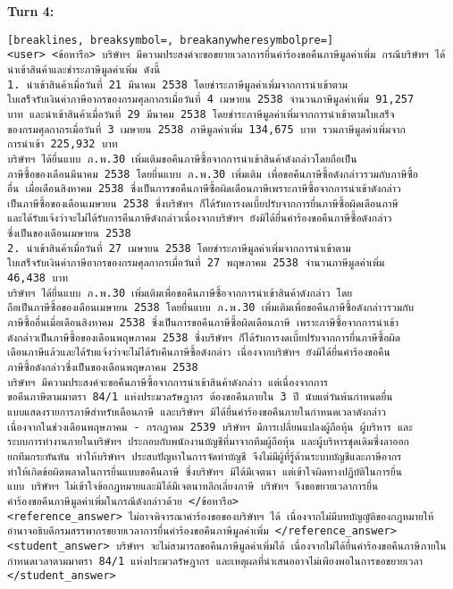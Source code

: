 \textbf{Turn 4: }
\begin{Verbatim}[breaklines, breaksymbol=, breakanywheresymbolpre=]
<user> <ข้อหารือ> บริษัทฯ มีความประสงค์จะขอขยายเวลาการยื่นคำร้องขอคืนภาษีมูลค่าเพิ่ม กรณีบริษัทฯ ได้
นำเข้าสินค้าและชำระภาษีมูลค่าเพิ่ม ดังนี้
1. นำเข้าสินค้าเมื่อวันที่ 21 มีนาคม 2538 โดยชำระภาษีมูลค่าเพิ่มจากการนำเข้าตาม
ใบเสร็จรับเงินค่าภาษีอากรของกรมศุลกากรเมื่อวันที่ 4 เมษายน 2538 จำนวนภาษีมูลค่าเพิ่ม 91,257
บาท และนำเข้าสินค้าเมื่อวันที่ 29 มีนาคม 2538 โดยชำระภาษีมูลค่าเพิ่มจากการนำเข้าตามใบเสร็จ
ของกรมศุลกากรเมื่อวันที่ 3 เมษายน 2538 ภาษีมูลค่าเพิ่ม 134,675 บาท รวมภาษีมูลค่าเพิ่มจาก
การนำเข้า 225,932 บาท
บริษัทฯ ได้ยื่นแบบ ภ.พ.30 เพิ่มเติมขอคืนภาษีซื้อจากการนำเข้าสินค้าดังกล่าวโดยถือเป็น
ภาษีซื้อของเดือนมีนาคม 2538 โดยยื่นแบบ ภ.พ.30 เพิ่มเติม เพื่อขอคืนภาษีซื้อดังกล่าวรวมกับภาษีซื้อ
อื่น เมื่อเดือนสิงหาคม 2538 ซึ่งเป็นการขอคืนภาษีซื้อผิดเดือนภาษีเพราะภาษีซื้อจากการนำเข้าดังกล่าว
เป็นภาษีซื้อของเดือนเมษายน 2538 ซึ่งบริษัทฯ ก็ได้รับการงดเบี้ยปรับจากการยื่นภาษีซื้อผิดเดือนภาษี
และได้รับแจ้งว่าจะไม่ได้รับการคืนภาษีดังกล่าวเนื่องจากบริษัทฯ ยังมิได้ยื่นคำร้องขอคืนภาษีซื้อดังกล่าว
ซึ่งเป็นของเดือนเมษายน 2538
2. นำเข้าสินค้าเมื่อวันที่ 27 เมษายน 2538 โดยชำระภาษีมูลค่าเพิ่มจากการนำเข้าตาม
ใบเสร็จรับเงินค่าภาษีอากรของกรมศุลกากรเมื่อวันที่ 27 พฤษภาคม 2538 จำนวนภาษีมูลค่าเพิ่ม
46,438 บาท
บริษัทฯ ได้ยื่นแบบ ภ.พ.30 เพิ่มเติมเพื่อขอคืนภาษีซื้อจากการนำเข้าสินค้าดังกล่าว โดย
ถือเป็นภาษีซื้อของเดือนเมษายน 2538 โดยยื่นแบบ ภ.พ.30 เพิ่มเติมเพื่อขอคืนภาษีซื้อดังกล่าวรวมกับ
ภาษีซื้ออื่นเมื่อเดือนสิงหาคม 2538 ซึ่งเป็นการขอคืนภาษีซื้อผิดเดือนภาษี เพราะภาษีซื้อจากการนำเข้า
ดังกล่าวเป็นภาษีซื้อของเดือนพฤษภาคม 2538 ซึ่งบริษัทฯ ก็ได้รับการงดเบี้ยปรับจากการยื่นภาษีซื้อผิด
เดือนภาษีแล้วและได้รับแจ้งว่าจะไม่ได้รับคืนภาษีซื้อดังกล่าว เนื่องจากบริษัทฯ ยังมิได้ยื่นคำร้องขอคืน
ภาษีซื้อดังกล่าวซึ่งเป็นของเดือนพฤษภาคม 2538
บริษัทฯ มีความประสงค์จะขอคืนภาษีซื้อจากการนำเข้าสินค้าดังกล่าว แต่เนื่องจากการ
ขอคืนภาษีตามมาตรา 84/1 แห่งประมวลรัษฎากร ต้องขอคืนภายใน 3 ปี นับแต่วันพ้นกำหนดยื่น
แบบแสดงรายการภาษีสำหรับเดือนภาษี และบริษัทฯ มิได้ยื่นคำร้องขอคืนภายในกำหนดเวลาดังกล่าว
เนื่องจากในช่วงเดือนพฤษภาคม - กรกฎาคม 2539 บริษัทฯ มีการเปลี่ยนแปลงผู้ถือหุ้น ผู้บริหาร และ
ระบบการทำงานภายในบริษัทฯ ประกอบกับพนักงานบัญชีที่มาจากทีมผู้ถือหุ้น และผู้บริหารชุดเดิมซึ่งลาออก
ยกทีมกระทันหัน ทำให้บริษัทฯ ประสบปัญหาในการจัดทำบัญชี จึงไม่มีผู้ที่รู้ด้านระบบบัญชีและภาษีอากร
ทำให้เกิดข้อผิดพลาดในการยื่นแบบขอคืนภาษี ซึ่งบริษัทฯ มิได้มีเจตนา แต่เข้าใจผิดทางปฏิบัติในการยื่น
แบบ บริษัทฯ ไม่เข้าใจข้อกฎหมายและมิได้มีเจตนาหลีกเลี่ยงภาษี บริษัทฯ จึงขอขยายเวลาการยื่น
คำร้องขอคืนภาษีมูลค่าเพิ่มในกรณีดังกล่าวด้วย </ข้อหารือ>
<reference_answer> ไม่อาจพิจารณาคำร้องขอของบริษัทฯ ได้ เนื่องจากไม่มีบทบัญญัติของกฎหมายให้อำนาจอธิบดีกรมสรรพากรขยายเวลาการยื่นคำร้องขอคืนภาษีมูลค่าเพิ่ม </reference_answer>
<student_answer> บริษัทฯ จะไม่สามารถขอคืนภาษีมูลค่าเพิ่มได้ เนื่องจากไม่ได้ยื่นคำร้องขอคืนภาษีภายในกำหนดเวลาตามมาตรา 84/1 แห่งประมวลรัษฎากร และเหตุผลที่นำเสนออาจไม่เพียงพอในการขอขยายเวลา </student_answer>



\end{Verbatim}
